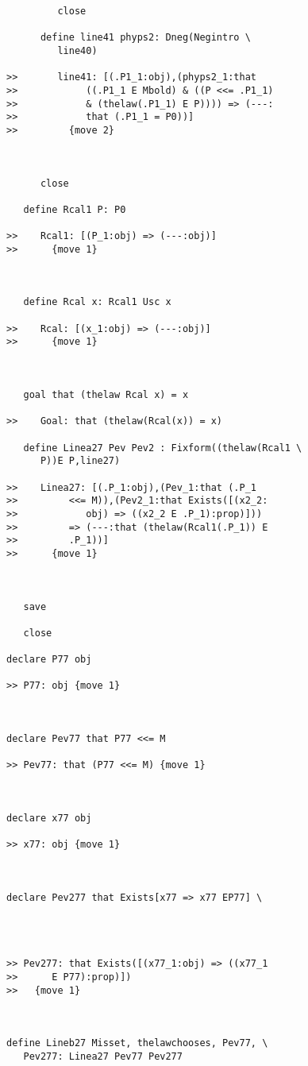 \documentclass[12pt]{article}
\begin{document}
\begin{verbatim}
         close

      define line41 phyps2: Dneg(Negintro \
         line40)

>>       line41: [(.P1_1:obj),(phyps2_1:that
>>            ((.P1_1 E Mbold) & ((P <<= .P1_1)
>>            & (thelaw(.P1_1) E P)))) => (---:
>>            that (.P1_1 = P0))]
>>         {move 2}



      close

   define Rcal1 P: P0

>>    Rcal1: [(P_1:obj) => (---:obj)]
>>      {move 1}



   define Rcal x: Rcal1 Usc x

>>    Rcal: [(x_1:obj) => (---:obj)]
>>      {move 1}



   goal that (thelaw Rcal x) = x

>>    Goal: that (thelaw(Rcal(x)) = x)

   define Linea27 Pev Pev2 : Fixform((thelaw(Rcal1 \
      P))E P,line27)

>>    Linea27: [(.P_1:obj),(Pev_1:that (.P_1
>>         <<= M)),(Pev2_1:that Exists([(x2_2:
>>            obj) => ((x2_2 E .P_1):prop)]))
>>         => (---:that (thelaw(Rcal1(.P_1)) E
>>         .P_1))]
>>      {move 1}



   save

   close

declare P77 obj

>> P77: obj {move 1}



declare Pev77 that P77 <<= M

>> Pev77: that (P77 <<= M) {move 1}



declare x77 obj

>> x77: obj {move 1}



declare Pev277 that Exists[x77 => x77 EP77] \
   



>> Pev277: that Exists([(x77_1:obj) => ((x77_1
>>      E P77):prop)])
>>   {move 1}



define Lineb27 Misset, thelawchooses, Pev77, \
   Pev277: Linea27 Pev77 Pev277


\end{verbatim}
\end{document}
